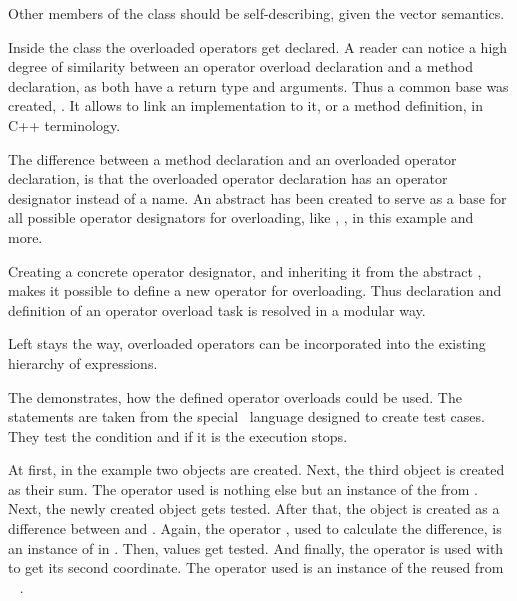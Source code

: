 Other members of the  class should be self-describing, given the vector semantics.

Inside the class the overloaded operators get declared. A reader can notice a high degree of
similarity between an operator overload declaration and a method declaration, as both 
have a return type and arguments. Thus a common base  was created, 
. It allows to link an implementation to it, or a method
definition, in C++ terminology.

The difference between a method declaration and an overloaded operator declaration, is that the
overloaded operator declaration has an operator designator instead of a name. An abstract 
 has been created to serve as a base for all possible operator designators
for overloading, like \cc{+}, \cc{-}, \cc{[]} in this example and more.

Creating a concrete operator designator, and inheriting it from the abstract  
,
makes it possible to define a new operator for overloading. Thus declaration and 
definition of an operator overload task is resolved in a modular way.

Left stays the way, overloaded operators can be incorporated into the existing
hierarchy of expressions.


The  demonstrates, how the defined operator overloads could 
be used. The  statements are taken from the special \mbdr\ language designed to
create test cases. They test the condition and if it is  the execution stops.

At first, in the example two  objects are created. Next, the third object is created 
as their sum. The \cc{+} operator used is nothing else but an instance of the  from 
\mbdr. Next, the newly created  object gets tested. After that, the  object is
created as a difference between  and . Again, the operator \cc{-}, used to calculate 
the difference, is an instance of   in \mbdr. Then,  values get tested. 
And finally, the \cc{[]} operator is used with  to get its second coordinate. The operator
used is an instance of the reused from \mbdr\  .

